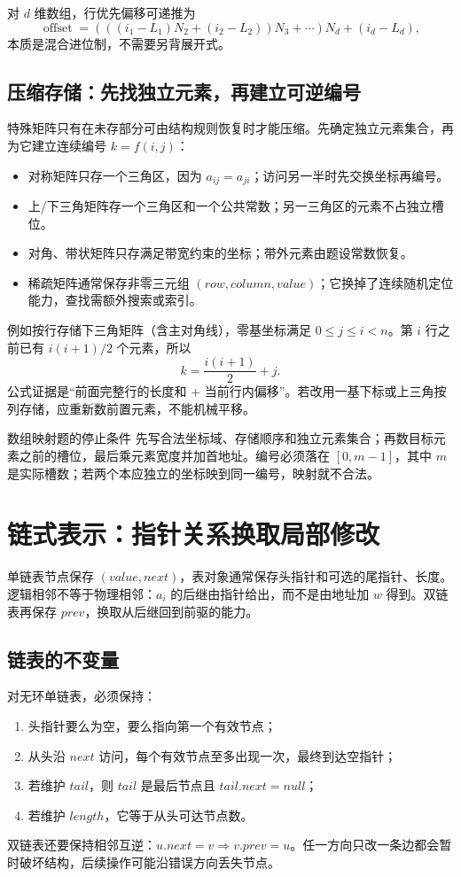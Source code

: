\documentclass[UTF8,fontset=none,11pt,a4paper]{ctexart}
\begin{document}
对 $d$ 维数组，行优先偏移可递推为
\[
\operatorname{offset}=(((i_1-L_1)N_2+(i_2-L_2))N_3+\cdots)N_d+(i_d-L_d),
\]
本质是混合进位制，不需要另背展开式。

\subsection{压缩存储：先找独立元素，再建立可逆编号}
特殊矩阵只有在未存部分可由结构规则恢复时才能压缩。先确定独立元素集合，再为它建立连续编号 $k=f(i,j)$：
\begin{itemize}
\item 对称矩阵只存一个三角区，因为 $a_{ij}=a_{ji}$；访问另一半时先交换坐标再编号。
\item 上/下三角矩阵存一个三角区和一个公共常数；另一三角区的元素不占独立槽位。
\item 对角、带状矩阵只存满足带宽约束的坐标；带外元素由题设常数恢复。
\item 稀疏矩阵通常保存非零三元组 $(row,column,value)$；它换掉了连续随机定位能力，查找需额外搜索或索引。
\end{itemize}
例如按行存储下三角矩阵（含主对角线），零基坐标满足 $0\le j\le i<n$。第 $i$ 行之前已有 $i(i+1)/2$ 个元素，所以
\[
k=\frac{i(i+1)}2+j.
\]
公式证据是“前面完整行的长度和 + 当前行内偏移”。若改用一基下标或上三角按列存储，应重新数前置元素，不能机械平移。

\begin{methodbox}{数组映射题的停止条件}
先写合法坐标域、存储顺序和独立元素集合；再数目标元素之前的槽位，最后乘元素宽度并加首地址。编号必须落在 $[0,m-1]$，其中 $m$ 是实际槽数；若两个本应独立的坐标映到同一编号，映射就不合法。
\end{methodbox}

\section{链式表示：指针关系换取局部修改}
单链表节点保存 $(value,next)$，表对象通常保存头指针和可选的尾指针、长度。逻辑相邻不等于物理相邻：$a_i$ 的后继由指针给出，而不是由地址加 $w$ 得到。双链表再保存 $prev$，换取从后继回到前驱的能力。

\subsection{链表的不变量}
对无环单链表，必须保持：
\begin{enumerate}
\item 头指针要么为空，要么指向第一个有效节点；
\item 从头沿 $next$ 访问，每个有效节点至多出现一次，最终到达空指针；
\item 若维护 $tail$，则 $tail$ 是最后节点且 $tail.next=null$；
\item 若维护 $length$，它等于从头可达节点数。
\end{enumerate}
双链表还要保持相邻互逆：$u.next=v\Rightarrow v.prev=u$。任一方向只改一条边都会暂时破坏结构，后续操作可能沿错误方向丢失节点。
\end{document}

